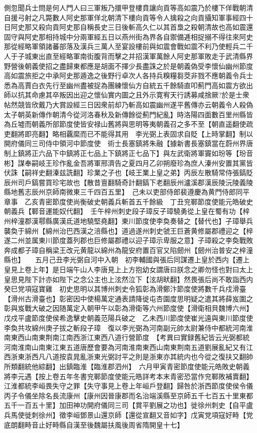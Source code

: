 側忽聞兵士問是何人門人曰三軍叛乃擐甲登樓賁讓向貢等高如震乃於樓下佯戰朝清自援弓射之凡斃數人阿史那軍佯北朝清下樓向貢等令人擒殺之向貢攝知軍事經四十日阿史那又殺向貢阿史那自稱長史三日後斬高久仁以其首梟之殺朝清故也高如震還固守與阿史那相持城中分兩軍經五日以燕州街為界各自禦備逓相捉搦不得往來阿史那從經略軍領諸蕃部落及漢兵三萬人至宴設樓前與如震會戰如震不利乃使輕兵二千人于子城東出直至經略軍南街腹背而擊之并招漢軍萬餘人阿史那軍敗走于武清縣界野營後朝義使招之盡歸東都應是胡面不擇少長盡誅之於是朝義偽受李懷仙幽州節度高如震旅拒之中承阿史那遁逸之後野行卓次人各持兵糗糧芻茭非戮不應朝義令兵士悉為高賈白衣先行至幽州盡被捉為團練懷仙方自統五千餘騎直叩薊門高如震方欲出師以抗其命慮其卒叛因出迎之懷仙實内圖之且外示寛宥天行誘募咸捨厥?於是士衆帖然競皆欣戴乃大賞設經三日因衆前却乃斬高如震幽州遂平舊傳亦云朝義令人殺偽太子朝英新傳作朝清今從河洛春秋及新傳餘從薊門紀亂】時洛陽四面數百里州縣皆為丘墟而朝義所部節度使皆安禄山舊將與思明等夷朝義召之多不至【朝直遥翻使疏吏翻將即亮翻】略相覊縻而已不能得其用　李光弼上表固求自貶【上時掌翻】制以開府儀同三司侍中領河中節度使　術士長塞鎮將朱融【據新書長塞鎮當在蔚州界唐制上鎮將正六品下中鎮將正七品上下鎮將正七品下】與左武衛將軍竇如玢等【玢音彬】謀奉嗣岐王珍作亂金吾將軍邢濟告之夏四月乙卯朔廢珍為庶人溱州安置其黨皆伏誅【嗣祥史翻溱兹詵翻】珍業之子也【岐王業上皇之弟】丙辰左散騎常侍張鎬貶辰州司戶鎬嘗買珍宅故也【散昔亶翻騎奇計翻鎬下老翻辰州瀘溪郡漢辰陵沅陵義陵縣地舊志辰州京師南微東三千四百五里】　己未以吏部侍郎裴遵慶為黄門侍郎同平章事　乙亥青密節度使尚衡破史朝義兵斬首五千餘級　丁丑兖鄆節度使能元皓破史朝義兵【鄆音運能奴代翻】　壬午梓州刺史段子璋反子璋驍勇從上皇在蜀有功【梓州梓潼郡漢鄠縣廣漢氐道地驍堅堯翻】東川節度使李奐奏替之【替代也】子璋舉兵襲奐于綿州【綿州治巴西漢之涪縣也】道過遂州刺史虢王巨蒼黄修屬郡禮迎之【梓遂二州並属東川節度蓋列郡也巨修屬郡禮以迎子璋示卑服之意】子璋殺之李奐戰敗奔成都子璋自稱梁王改元黄龍以綿州為龍安府置百官又陷劒州【劒州治普安之梓潼縣也】　　五月己丑李光弼自河中入朝　初李輔國與張后同謀遷上皇於西内【遷上皇見上卷上年】是日端午山人李唐見上上方抱幼女謂唐曰朕念之卿勿怪也對曰太上皇思見陛下計亦如陛下之念公主也上泫然泣下【泫胡畎翻】然畏張后尚不敢詣西内　癸巳党項寇寶雞　初史思明以其博州刺史令狐彰為滑鄭汴節度使將數千兵戍滑臺【滑州古滑臺也】彰密因中使楊萬定通表請降徙屯杏園度思明疑之遣其將薛岌圍之彰與岌戰大破之因随萬定入朝甲午以彰為滑衛等六州節度使【滑衛相貝魏博六州】　戊戍平盧節度使侯希逸擊史朝義范陽兵破之　乙未西川節度使崔光遠與東川節度使李奐共攻綿州庚子拔之斬段子璋　復以李光弼為河南副元帥太尉兼侍中都統河南淮南東西山南東荆南江南西浙江東西八道行營節度　【考異曰實録舊紀皆云光弼都統河南淮南山南東江東五道唐歷會要為河南淮南東西山南東荆南五道劉展亂紀又有江西浙東浙西凡八道按袁晁亂浙東光弼討平之則是浙東亦其統内也今從之復扶又翻帥所類翻統他綜翻】出鎮臨淮【臨淮郡泗州】　六月甲寅青密節度使能元皓敗史朝義將李元遇【按上卷五年冬書兖鄆節度使能元皓詳考本末青密恐當作兖鄆敗補賣翻】　江淮都統李峘畏失守之罪【失守事見上卷上年峘戶登翻】歸咎於浙西節度使侯令儀丙子令儀坐除名長流康州【康州因晉康郡而名治端溪縣至京師五千七百五十里東都五千一百五十里】加田神功開府儀同三司【賞平劉展之功也】徙徐州刺史【自平盧兵馬使徙刺徐州】徵李峘鄧景山還京師【還從宣翻又音如字】戊寅党項寇好畤【党底朗翻畤音止好畤縣自漢至後魏屬扶風後周省隋開皇十七】

